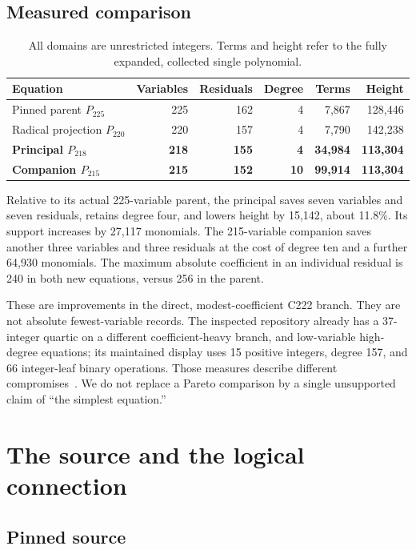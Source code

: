 \documentclass[11pt,letterpaper]{article}
\theoremstyle{definition}\newtheorem{definition}[theorem]{Definition}
\theoremstyle{remark}\newtheorem{remark}[theorem]{Remark}
\newcommand{\Pq}{P_{218}}\newcommand{\Pd}{P_{215}}
\begin{document}
\subsection{Measured comparison}

\begin{table}[H]
\centering\small
\begin{tabular}{lrrrrr}
\toprule
Equation & Variables & Residuals & Degree & Terms & Height\\
\midrule
Pinned parent $P_{225}$ &225&162&4&7,867&128,446\\
Radical projection $P_{220}$ &220&157&4&7,790&142,238\\
\textbf{Principal $\Pq$} &\textbf{218}&\textbf{155}&\textbf{4}&\textbf{34,984}&\textbf{113,304}\\
\textbf{Companion $\Pd$} &\textbf{215}&\textbf{152}&\textbf{10}&\textbf{99,914}&\textbf{113,304}\\
\bottomrule
\end{tabular}
\caption{All domains are unrestricted integers. Terms and height refer
to the fully expanded, collected single polynomial.}
\label{tab:metrics}
\end{table}

Relative to its actual 225-variable parent, the principal saves seven
variables and seven residuals, retains degree four, and lowers height by
15,142, about 11.8\%. Its support increases by 27,117 monomials. The
215-variable companion saves another three variables and three residuals
at the cost of degree ten and a further 64,930 monomials. The maximum
absolute coefficient in an individual residual is 240 in both new
equations, versus 256 in the parent.

These are improvements in the direct, modest-coefficient C222 branch.
They are not absolute fewest-variable records. The inspected repository
already has a 37-integer quartic on a different coefficient-heavy branch,
and low-variable high-degree equations; its maintained display uses 15
positive integers, degree 157, and 66 integer-leaf binary operations.
Those measures describe different compromises~\cite{catalog,current}.
We do not replace a Pareto comparison by a single unsupported claim of
``the simplest equation.''

\section{The source and the logical connection}

\subsection{Pinned source}
\end{document}
